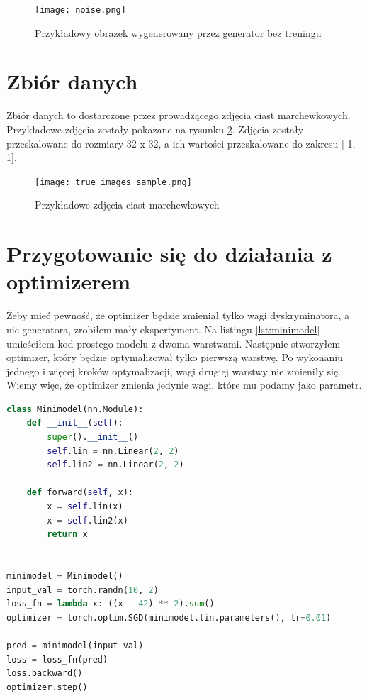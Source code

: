 \documentclass[a4paper]{article}
\begin{document}
\begin{figure}[H]
    \centering
    \texttt{[image: noise.png]}
    \caption{Przykładowy obrazek wygenerowany przez generator bez treningu}
    \label{fig:noise}
\end{figure}


\section{Zbiór danych}

Zbiór danych to dostarczone przez prowadzącego zdjęcia ciast marchewkowych.
Przykładowe zdjęcia zostały pokazane na rysunku \ref{fig:true_images_sample}.
Zdjęcia zostały przeskalowane do rozmiary 32 x 32, a ich wartości
przeskalowane do zakresu [-1, 1].

\begin{figure}[H]
    \centering
    \texttt{[image: true\_images\_sample.png]}
    \caption{Przykładowe zdjęcia ciast marchewkowych}
    \label{fig:true_images_sample}
\end{figure}

\section{Przygotowanie się do działania z optimizerem}

Żeby mieć pewność, że optimizer będzie zmieniał tylko wagi dyskryminatora,
a nie generatora, zrobiłem mały ekspertyment. Na listingu \ref{lst:minimodel}
umieściłem kod prostego modelu z dwoma warstwami. Następnie stworzyłem
optimizer, który będzie optymalizował tylko pierwszą warstwę. Po wykonaniu
jednego i więcej kroków optymalizacji, wagi drugiej warstwy nie zmieniły się.
Wiemy więc, że optimizer zmienia jedynie wagi, które mu podamy jako parametr.

\begin{lstlisting}[language=python,label={lst:minimodel},caption={Eksperyment z optimizerem}]
class Minimodel(nn.Module):
    def __init__(self):
        super().__init__()
        self.lin = nn.Linear(2, 2)
        self.lin2 = nn.Linear(2, 2)

    def forward(self, x):
        x = self.lin(x)
        x = self.lin2(x)
        return x


minimodel = Minimodel()
input_val = torch.randn(10, 2)
loss_fn = lambda x: ((x - 42) ** 2).sum()
optimizer = torch.optim.SGD(minimodel.lin.parameters(), lr=0.01)

pred = minimodel(input_val)
loss = loss_fn(pred)
loss.backward()
optimizer.step()
\end{lstlisting}
\end{document}
